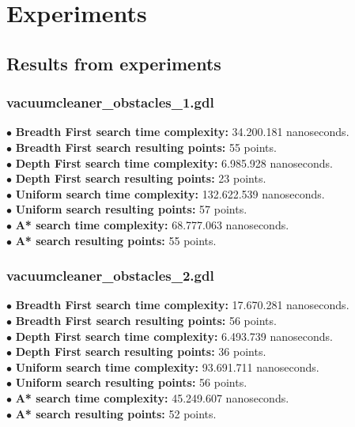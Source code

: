\documentclass[11pt]{article}
\begin{document}
\section{Experiments}
\subsection{Results from experiments}
\subsubsection{vacuumcleaner\_obstacles\_1.gdl}
$\bullet$ {\bf Breadth First search time complexity: } 34.200.181 nanoseconds. \\
$\bullet$ {\bf Breadth First search resulting points: } 55 points. \\
$\bullet$ {\bf Depth First search time complexity: } 6.985.928 nanoseconds. \\
$\bullet$ {\bf Depth First search resulting points: } 23 points. \\
$\bullet$ {\bf Uniform search time complexity: } 132.622.539 nanoseconds.\\
$\bullet$ {\bf Uniform search resulting points: } 57 points.\\
$\bullet$ {\bf A* search time complexity: } 68.777.063 nanoseconds.\\ 
$\bullet$ {\bf A* search resulting points: } 55 points.\\
\subsubsection{vacuumcleaner\_obstacles\_2.gdl}
$\bullet$ {\bf Breadth First search time complexity: } 17.670.281 nanoseconds. \\
$\bullet$ {\bf Breadth First search resulting points: } 56 points. \\
$\bullet$ {\bf Depth First search time complexity: } 6.493.739 nanoseconds. \\
$\bullet$ {\bf Depth First search resulting points: } 36 points. \\
$\bullet$ {\bf Uniform search time complexity: }  93.691.711 nanoseconds. \\
$\bullet$ {\bf Uniform search resulting points: } 56 points.\\
$\bullet$ {\bf A* search time complexity: } 45.249.607 nanoseconds.\\ 
$\bullet$ {\bf A* search resulting points: } 52 points.\\
\end{document}

